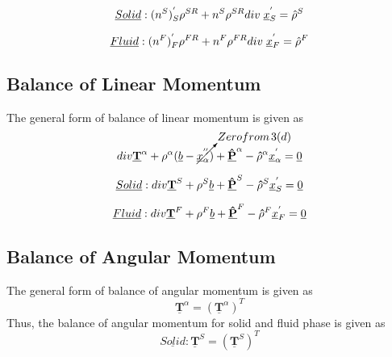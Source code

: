 \documentclass[12pt]{article}
\begin{document}
\begin{equation}
	{\underline{Solid}}      : ({{{n}}}^{S})_{S}^{'} {\rho^{SR}} + {{n}^{S}}{\rho^{S R}}{{div}\hspace{1mm}{{\underline{{x}}}_{S}^{'}}} = {\hat{\rho}}^{S}
\end{equation}

\begin{equation}
	{\underline{Fluid}}      : ({{{n}}}^{F})_{F}^{'} {\rho^{FR}} + {{n}^{F}}{\rho^{F R}}{{div}\hspace{1mm}{{\underline{{x}}}_{F}^{'}}} = {\hat{\rho}}^{F}
\end{equation}
\vspace{3mm}


\subsection{Balance of Linear Momentum}
The general form of balance of linear momentum is given as
\begin{equation*}
	{div}\vspace{1mm}{\underline{\mathbf{T}}}^{\alpha} + {\rho}^{\alpha}(\underline{b} - \cancelto{Zero from \hspace{0.5mm}3(d)}{{\underline{{x}}}_{\alpha}^{''})} + \underline{\mathbf{\hat{P}}}^{\alpha} - {\mathbf{\hat{\rho}}}^{\alpha}{\underline{{x}}}_{\alpha}^{'} = \underline{0}
\end{equation*}

\begin{equation}
	{\underline{Solid}}      : {div}\vspace{1mm}{\underline{\mathbf{T}}}^{S} + {\rho}^{S}{\underline{b} + \underline{\mathbf{\hat{P}}}^{S}} - {\mathbf{\hat{\rho}}}^{S}{\underline{{x}}}_{S}^{'} = \underline{0}
\end{equation}

\begin{equation}
	{\underline{Fluid}}      : {div}\vspace{1mm}{\underline{\mathbf{T}}}^{F} + {\rho}^{F}{\underline{b}  + \underline{\mathbf{\hat{P}}}^{F}} - {\mathbf{\hat{\rho}}}^{F}{\underline{{x}}}_{F}^{'} = \underline{0}
\end{equation}

\subsection{Balance of Angular Momentum}
The general form of balance of angular momentum is given as
\begin{equation*}
	{\underline{\mathbf{T}}}^{\alpha} = ({\underline{\mathbf{T}}}^{\alpha})^T
\end{equation*}
Thus, the balance of angular momentum for solid and fluid phase is given as
\begin{equation}
	{\underline{Solid}}      : {\underline{\mathbf{T}}}^{S} = ({\underline{\mathbf{T}}}^{S})^T
\end{equation}
\end{document}
